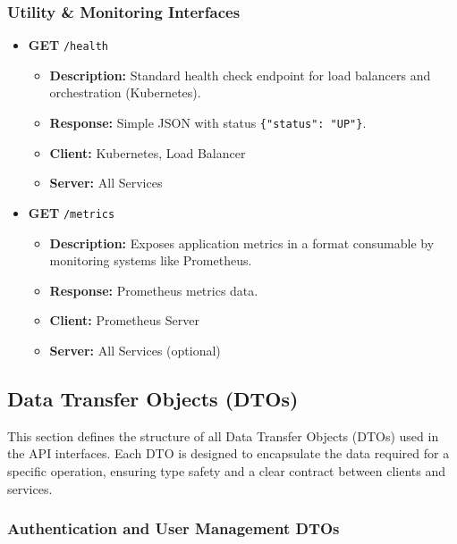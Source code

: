 \subsubsection{Utility \& Monitoring Interfaces}
\begin{itemize}
    \item \textbf{GET} \texttt{/health}
    \begin{itemize}
        \item \textbf{Description:} Standard health check endpoint for load balancers and orchestration (Kubernetes).
        \item \textbf{Response:} Simple JSON with status \texttt{\{"status": "UP"\}}.
        \item \textbf{Client:} Kubernetes, Load Balancer
        \item \textbf{Server:} All Services
    \end{itemize}
    
    \item \textbf{GET} \texttt{/metrics}
    \begin{itemize}
        \item \textbf{Description:} Exposes application metrics in a format consumable by monitoring systems like Prometheus.
        \item \textbf{Response:} Prometheus metrics data.
        \item \textbf{Client:} Prometheus Server
        \item \textbf{Server:} All Services (optional)
    \end{itemize}
\end{itemize}
\subsection{Data Transfer Objects (DTOs)}
This section defines the structure of all Data Transfer Objects (DTOs) used in the API interfaces. Each DTO is designed to encapsulate the data required for a specific operation, ensuring type safety and a clear contract between clients and services.

\subsubsection{Authentication and User Management DTOs}

